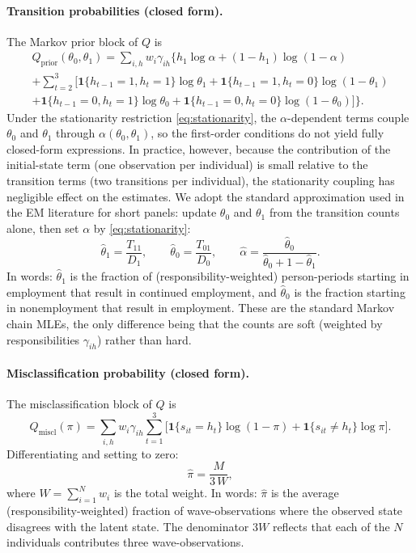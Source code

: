 \documentclass[12pt]{article}
\begin{document}
\paragraph{Transition probabilities (closed form).}
The Markov prior block of \(Q\) is
\begin{multline}
Q_{\text{prior}}(\theta_0, \theta_1) =
\sum_{i, h} w_i \gamma_{ih} \bigg\{
  h_1 \log\alpha + (1 - h_1)\log(1 - \alpha) \\
  + \sum_{t=2}^{3} \Big[
    \mathbf{1}\{h_{t-1}{=}1, h_t{=}1\}\log\theta_1
    + \mathbf{1}\{h_{t-1}{=}1, h_t{=}0\}\log(1 - \theta_1) \\
    + \mathbf{1}\{h_{t-1}{=}0, h_t{=}1\}\log\theta_0
    + \mathbf{1}\{h_{t-1}{=}0, h_t{=}0\}\log(1 - \theta_0)
  \Big]
\bigg\}.
\label{eq:Q_prior}
\end{multline}
Under the stationarity restriction \eqref{eq:stationarity}, the
\(\alpha\)-dependent terms couple \(\theta_0\) and \(\theta_1\) through
\(\alpha(\theta_0, \theta_1)\), so the first-order conditions do not
yield fully closed-form expressions. In practice, however, because the
contribution of the initial-state term (one observation per individual)
is small relative to the transition terms (two transitions per
individual), the stationarity coupling has negligible effect on the
estimates. We adopt the standard approximation used in the EM literature
for short panels: update \(\theta_0\) and \(\theta_1\) from the
transition counts alone, then set \(\alpha\) by
\eqref{eq:stationarity}:
\begin{equation}
\hat{\theta}_1 = \frac{T_{11}}{D_1}, \qquad
\hat{\theta}_0 = \frac{T_{01}}{D_0}, \qquad
\hat{\alpha} = \frac{\hat{\theta}_0}{\hat{\theta}_0 + 1 - \hat{\theta}_1}.
\label{eq:mstep_theta}
\end{equation}
In words: \(\hat{\theta}_1\) is the fraction of
(responsibility-weighted) person-periods starting in employment that
result in continued employment, and \(\hat{\theta}_0\) is the fraction
starting in nonemployment that result in employment. These are the
standard Markov chain MLEs, the only difference being that the counts
are soft (weighted by responsibilities \(\gamma_{ih}\)) rather than hard.

\paragraph{Misclassification probability (closed form).}
The misclassification block of \(Q\) is
\[
Q_{\text{miscl}}(\pi) = \sum_{i, h} w_i \gamma_{ih}
\sum_{t=1}^{3} \Big[
  \mathbf{1}\{s_{it} = h_t\}\log(1 - \pi)
  + \mathbf{1}\{s_{it} \neq h_t\}\log\pi
\Big].
\]
Differentiating and setting to zero:
\begin{equation}
\hat{\pi} = \frac{M}{3\,W},
\label{eq:mstep_pi}
\end{equation}
where \(W = \sum_{i=1}^{N} w_i\) is the total weight. In words:
\(\hat{\pi}\) is the average (responsibility-weighted) fraction of
wave-observations where the observed state disagrees with the latent
state. The denominator \(3W\) reflects that each of the \(N\) individuals
contributes three wave-observations.
\end{document}
